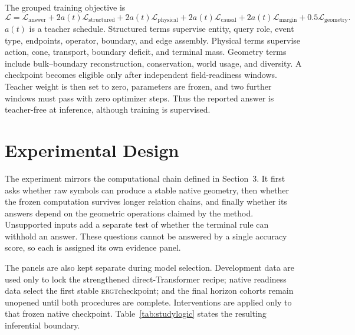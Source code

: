 \documentclass[11pt]{article}
\newcommand{\ERGT}{\textsc{ergt}}
\begin{document}
The grouped training objective is
\begin{equation}
\mathcal{L}=\mathcal{L}_{\mathrm{answer}}
+2a(t)\mathcal{L}_{\mathrm{structured}}
+2a(t)\mathcal{L}_{\mathrm{physical}}
+2a(t)\mathcal{L}_{\mathrm{causal}}
+2a(t)\mathcal{L}_{\mathrm{margin}}
+0.5\mathcal{L}_{\mathrm{geometry}}.
\label{eq:loss}
\end{equation}
$a(t)$ is a teacher schedule. Structured terms supervise entity, query role,
event type, endpoints, operator, boundary, and edge assembly. Physical terms
supervise action, cone, transport, boundary deficit, and terminal mass.
Geometry terms include bulk--boundary reconstruction, conservation, world
usage, and diversity. A checkpoint becomes eligible only after independent
field-readiness windows. Teacher weight is then set to zero, parameters are
frozen, and two further windows must pass with zero optimizer steps. Thus the
reported answer is teacher-free at inference, although training is supervised.

\section{Experimental Design}
\label{sec:experimental}

The experiment mirrors the computational chain defined in Section~3. It first
asks whether raw symbols can produce a stable native geometry, then whether the
frozen computation survives longer relation chains, and finally whether its
answers depend on the geometric operations claimed by the method. Unsupported
inputs add a separate test of whether the terminal rule can withhold an answer.
These questions cannot be answered by a single accuracy score, so each is
assigned its own evidence panel.

The panels are also kept separate during model selection. Development data are
used only to lock the strengthened direct-Transformer recipe; native readiness
data select the first stable \ERGT checkpoint; and the final horizon cohorts
remain unopened until both procedures are complete. Interventions are applied
only to that frozen native checkpoint. Table~\ref{tab:studylogic} states the
resulting inferential boundary.
\end{document}
